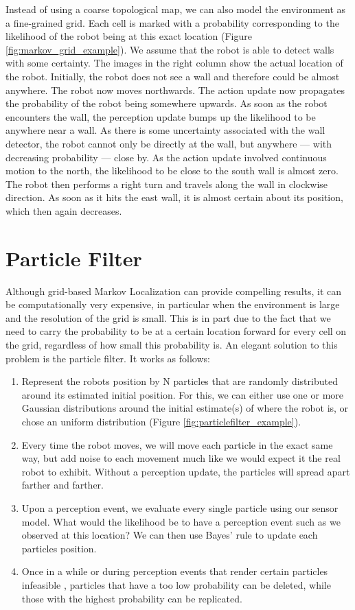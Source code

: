 Instead of using a coarse topological map, we can also model the environment as a fine-grained grid. Each cell is marked with a probability corresponding to the likelihood of the robot being at this exact location (Figure \ref{fig:markov_grid_example}). We assume that the robot is able to detect walls with some certainty. The images in the right column show the actual location of the robot. Initially, the robot does not see a wall and therefore could be almost anywhere. The robot now moves northwards. The action update now propagates the probability of the robot being somewhere upwards. As soon as the robot encounters the wall, the perception update bumps up the likelihood to be anywhere near a wall. As there is some uncertainty associated with the wall detector, the robot cannot only be directly at the wall, but anywhere --- with decreasing probability --- close by. As the action update involved continuous motion to the north, the likelihood to be close to the south wall is almost zero. The robot then performs a right turn and travels along the wall in clockwise direction. As soon as it hits the east wall, it is almost certain about its position, which then again decreases.

\section{Particle Filter}
Although grid-based Markov Localization can provide compelling results, it can be computationally very expensive, in particular when the environment is large and the resolution of the grid is small. This is in part due to the fact that we need to carry the probability to be at a certain location forward for every cell on the grid, regardless of how small this probability is. An elegant solution to this problem is the particle filter. It works as follows:
\begin{enumerate}
\item Represent the robots position by N particles that are randomly distributed around its estimated initial position. For this, we can either use one or more Gaussian distributions around the initial estimate(s) of where the robot is, or chose an uniform distribution (Figure \ref{fig:particlefilter_example}).
\item Every time the robot moves, we will move each particle in the exact same way, but add noise to each movement much like we would expect it the real robot to exhibit. Without a perception update, the particles will spread apart farther and farther.
\item Upon a perception event, we evaluate every single particle using our sensor model. What would the likelihood be to have a perception event such as we observed at this location? We can then use Bayes' rule to update each particles position.
\item Once in a while or during perception events that render certain particles infeasible , particles that have a too low probability can be deleted, while those with the highest probability can be replicated.
\end{enumerate}

